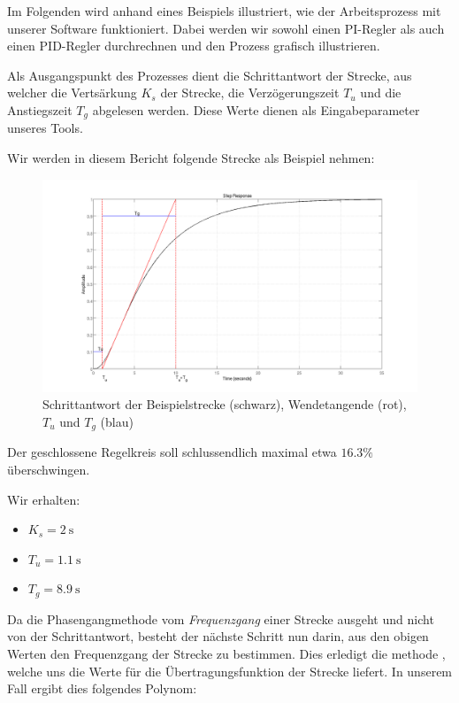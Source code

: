 Im Folgenden wird  anhand eines Beispiels illustriert,  wie der Arbeitsprozess
mit unserer Software funktioniert. Dabei werden wir sowohl einen PI-Regler als
auch einen PID-Regler durchrechnen und den Prozess grafisch illustrieren.

Als  Ausgangspunkt  des  Prozesses   dient  die  Schrittantwort  der  Strecke,
aus  welcher  die  Verts\"arkung  $K_s$ der  Strecke,  die  Verz\"ogerungszeit
$T_u$  und die  Anstiegszeit $T_g$  abgelesen werden. Diese  Werte dienen  als
Eingabeparameter unseres Tools.

Wir werden in diesem Bericht folgende Strecke als Beispiel nehmen:
\begin{figure}[h! width=\pagewidth]
    \includegraphics[width=.9\textwidth]{images/streckeSchrittantwort.png}
    \caption{%
    Schrittantwort der  Beispielstrecke (schwarz), Wendetangende  (rot), $T_u$
    und $T_g$ (blau)%
    }
    \label{fig:plant_step}
\end{figure}

Der  geschlossene   Regelkreis  soll  schlussendlich  maximal   etwa  $16.3\%$
\"uberschwingen.

Wir erhalten:
\begin{itemize}
    \item
        $K_s = \SI{2}{\second}$
    \item
        $T_u = \SI{1.1}{\second}$
    \item
        $T_g = \SI{8.9}{\second}$
\end{itemize}

Da  die Phasengangmethode  vom {\em{Frequenzgang}}  einer Strecke  ausgeht und
nicht von der Schrittantwort, besteht der n\"achste Schritt nun darin, aus den
obigen Werten  den Frequenzgang  der Strecke  zu bestimmen. Dies  erledigt die
methode , welche uns  die Werte f\"ur die \"Ubertragungsfunktion
der  Strecke   liefert.     In  unserem  Fall  ergibt  dies  folgendes
Polynom:

